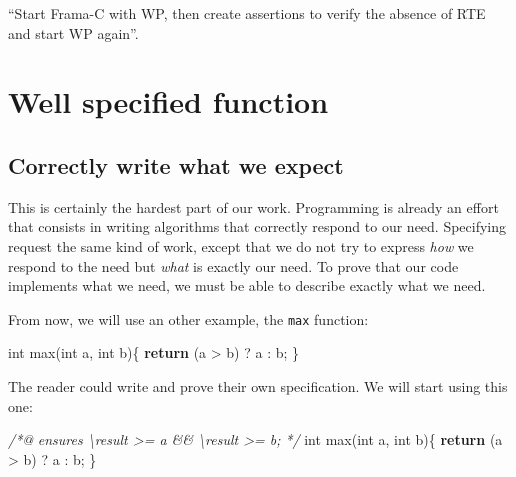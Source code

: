 \documentclass[12pt,francais,]{scrbook}
\newenvironment{Shaded}{}{}
\newcommand{\KeywordTok}[1]{\textcolor[rgb]{0.00,0.44,0.13}{\textbf{{#1}}}}
\newcommand{\DataTypeTok}[1]{\textcolor[rgb]{0.56,0.13,0.00}{{#1}}}
\newcommand{\CommentTok}[1]{\textcolor[rgb]{0.38,0.63,0.69}{\textit{{#1}}}}
\newcommand{\NormalTok}[1]{{#1}}
\begin{document}
\begin{footnotesize}\begin{Shaded}
\end{Shaded}\end{footnotesize}

``Start Frama-C with WP, then create assertions to verify the absence of
RTE and start WP again''.

\section{Well specified function}\label{well-specified-function}

\subsection{Correctly write what we
expect}\label{correctly-write-what-we-expect}

This is certainly the hardest part of our work. Programming is already
an effort that consists in writing algorithms that correctly respond to
our need. Specifying request the same kind of work, except that we do
not try to express \emph{how} we respond to the need but \emph{what} is
exactly our need. To prove that our code implements what we need, we
must be able to describe exactly what we need.

From now, we will use an other example, the \texttt{max} function:

\begin{footnotesize}\begin{Shaded}
\begin{Highlighting}[]
\DataTypeTok{int} \NormalTok{max(}\DataTypeTok{int} \NormalTok{a, }\DataTypeTok{int} \NormalTok{b)\{}
  \KeywordTok{return} \NormalTok{(a > b) ? a : b;}
\NormalTok{\}}
\end{Highlighting}
\end{Shaded}\end{footnotesize}

The reader could write and prove their own specification. We will start
using this one:

\begin{footnotesize}\begin{Shaded}
\begin{Highlighting}[]
\CommentTok{/*@}
\CommentTok{  ensures \textbackslash{}result >= a && \textbackslash{}result >= b;}
\CommentTok{*/}
\DataTypeTok{int} \NormalTok{max(}\DataTypeTok{int} \NormalTok{a, }\DataTypeTok{int} \NormalTok{b)\{}
  \KeywordTok{return} \NormalTok{(a > b) ? a : b;}
\NormalTok{\}}
\end{Highlighting}
\end{Shaded}\end{footnotesize}
\end{document}
